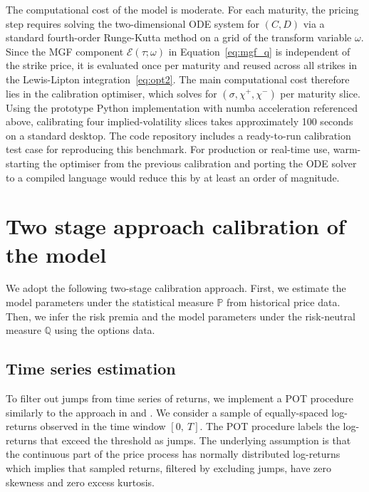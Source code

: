 \documentclass[11pt,a4paper]{article}
\numberwithin{equation}{section}
\theoremstyle{remark}
\theoremstyle{definition}
\newcommand{\Ec}{\mathcal{E}}
\begin{document}
The computational cost of the model is moderate.
For each maturity, the pricing step requires solving the two-dimensional
ODE system for $(C,D)$ via a standard fourth-order Runge-Kutta method
on a grid of the transform variable $\omega$.
Since the MGF component $\Ec(\tau;\omega)$ in Equation~\eqref{eq:mgf_q}
is independent of the strike price, it is evaluated once per maturity
and reused across all strikes in the Lewis-Lipton integration~\eqref{eq:opt2}.
The main computational cost therefore lies in the calibration optimiser,
which solves for $(\sigma, \chi^+, \chi^-)$ per maturity slice.
Using the prototype Python implementation with numba acceleration
referenced above, calibrating four implied-volatility slices
takes approximately 100 seconds on a standard desktop.
The code repository includes a ready-to-run calibration test case
for reproducing this benchmark.
For production or real-time use, warm-starting the optimiser
from the previous calibration and porting the ODE solver
to a compiled language would reduce this by at least an order of magnitude.

\section{Two stage approach calibration of the model}\label{sec:two_stage}
We adopt the following two-stage calibration approach. First, we estimate the model parameters under the statistical measure $\mathbb{P}$ from historical price data. Then, we infer the risk premia and the model parameters under the risk-neutral measure $\mathbb{Q}$ using the options data.

\subsection{Time series estimation}\label{sec:firststage}
To filter out jumps from time series of returns, we implement a POT procedure similarly to the approach in \cite{embrechts2011multivariate} and \cite[Chapter 4]{hainaut2022continuous}. We consider a sample of equally-spaced log-returns observed in the time window $[0,\ T]$.
 The POT procedure labels the log-returns that exceed the threshold as jumps. The underlying assumption is that the continuous part of the price process has normally distributed log-returns which implies that sampled returns, filtered by excluding jumps, have zero skewness and zero excess kurtosis.
\end{document}
